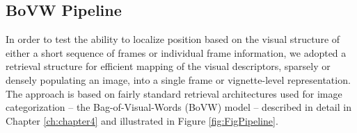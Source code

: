 %
%
%
%

\subsection{BoVW Pipeline}
In order to test the ability to localize position based on the visual structure of either a short sequence of frames or individual frame information, we adopted a retrieval structure for efficient mapping of the visual descriptors, sparsely or densely populating an image,  into a single frame or vignette-level representation.  The approach is based on fairly standard retrieval architectures used for image categorization -- the Bag-of-Visual-Words (BoVW) model -- described in detail in Chapter \ref{ch:chapter4} and illustrated in Figure \ref{fig:FigPipeline}.

